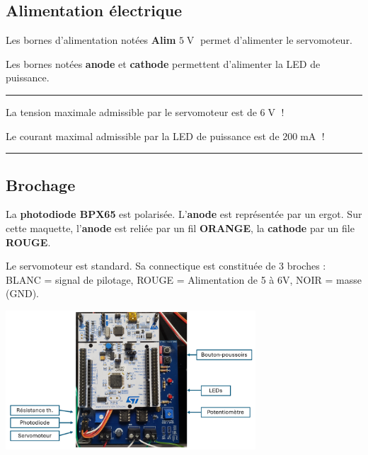\documentclass[a4paper,11pt,titlepage]{article} %
\begin{document}
\subsection{Alimentation électrique}

Les bornes d'alimentation notées \textbf{Alim} $5\operatorname{V}$ permet d'alimenter le servomoteur.

Les bornes notées \textbf{anode} et \textbf{cathode} permettent d'alimenter la LED de puissance.

\noindent \rule{\linewidth}{1pt}

{\LARGE La tension maximale admissible par le servomoteur est de $6\operatorname{V}$ !}

{\Large Le courant maximal admissible par la LED de puissance est de $200\operatorname{mA}$ !}

\noindent \rule{\linewidth}{1pt}


\subsection{Brochage}

La \textbf{photodiode BPX65} est polarisée. L'\textbf{anode} est représentée par un ergot. Sur cette maquette, l'\textbf{anode} est reliée par un fil \textbf{ORANGE}, la \textbf{cathode} par un file \textbf{ROUGE}.

Le servomoteur est standard. Sa connectique est constituée de 3 broches : BLANC = signal de pilotage, ROUGE = Alimentation de 5 à 6V, NOIR = masse (GND).


\begin{center}
	\includegraphics[width=0.7\textwidth]{images/maquette_rayon_nucleo.png}
\end{center}
\end{document}
